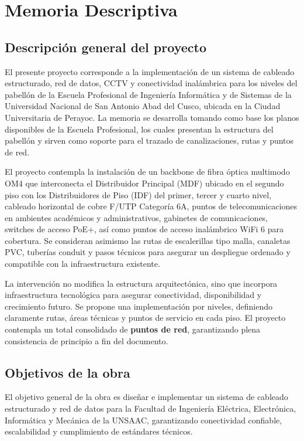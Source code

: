 \chapter{Memoria Descriptiva}

\section{Descripción general del proyecto}

El presente proyecto corresponde a la implementación de un sistema de cableado estructurado, red de datos, CCTV y conectividad inalámbrica para los \totalPisos{} niveles del pabellón de la Escuela Profesional de Ingeniería Informática y de Sistemas de la Universidad Nacional de San Antonio Abad del Cusco, ubicada en la Ciudad Universitaria de Perayoc. La memoria se desarrolla tomando como base los planos disponibles de la Escuela Profesional, los cuales presentan la estructura del pabellón y sirven como soporte para el trazado de canalizaciones, rutas y puntos de red.

El proyecto contempla la instalación de un backbone de fibra óptica multimodo OM4 que interconecta el Distribuidor Principal (MDF) ubicado en el segundo piso con los Distribuidores de Piso (IDF) del primer, tercer y cuarto nivel, cableado horizontal de cobre F/UTP Categoría 6A, puntos de telecomunicaciones en ambientes académicos y administrativos, gabinetes de comunicaciones, switches de acceso PoE+, así como puntos de acceso inalámbrico WiFi 6 para cobertura. Se consideran asimismo las rutas de escalerillas tipo malla, canaletas PVC, tuberías conduit y pasos técnicos para asegurar un despliegue ordenado y compatible con la infraestructura existente.

La intervención no modifica la estructura arquitectónica, sino que incorpora infraestructura tecnológica para asegurar conectividad, disponibilidad y crecimiento futuro. Se propone una implementación por niveles, definiendo claramente rutas, áreas técnicas y puntos de servicio en cada piso. El proyecto contempla un total consolidado de \textbf{\totalPuntos{} puntos de red}, garantizando plena consistencia de principio a fin del documento.

\section{Objetivos de la obra}

El objetivo general de la obra es diseñar e implementar un sistema de cableado estructurado y red de datos para la Facultad de Ingeniería Eléctrica, Electrónica, Informática y Mecánica de la UNSAAC, garantizando conectividad confiable, escalabilidad y cumplimiento de estándares técnicos.

